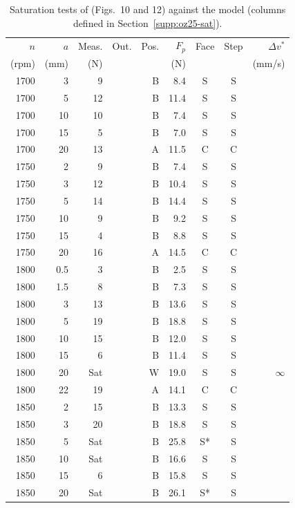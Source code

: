 \begin{table}[!htbp]
  \centering
  \caption{Saturation tests of \citet{ozsoy2025frequency} (Figs.~10 and 12) against the model (columns defined in Section~\ref{supp:oz25-sat}).}
  \label{tab:oz25}
  \scriptsize
  \setlength{\tabcolsep}{4pt}
  \renewcommand{\arraystretch}{0.84}
  \begin{tabular}{@{}rrrcrrccr@{}}
    \toprule
    $n$ & $a$ & Meas. & Out. & Pos. & $F_p$ & Face & Step & $\Delta v^*$\\
    (rpm) & (mm) & (N) & & & (N) & & & (mm/s)\\
    \midrule
1700 & 3 & 9 &  & B & 8.4 & S & S & \\
1700 & 5 & 12 &  & B & 11.4 & S & S & \\
1700 & 10 & 10 &  & B & 7.4 & S & S & \\
1700 & 15 & 5 &  & B & 7.0 & S & S & \\
1700 & 20 & 13 &  & A & 11.5 & C & C & \\
1750 & 2 & 9 &  & B & 7.4 & S & S & \\
1750 & 3 & 12 &  & B & 10.4 & S & S & \\
1750 & 5 & 14 &  & B & 14.4 & S & S & \\
1750 & 10 & 9 &  & B & 9.2 & S & S & \\
1750 & 15 & 4 &  & B & 8.8 & S & S & \\
1750 & 20 & 16 &  & A & 14.5 & C & C & \\
1800 & 0.5 & 3 &  & B & 2.5 & S & S & \\
1800 & 1.5 & 8 &  & B & 7.3 & S & S & \\
1800 & 3 & 13 &  & B & 13.6 & S & S & \\
1800 & 5 & 19 &  & B & 18.8 & S & S & \\
1800 & 10 & 15 &  & B & 12.0 & S & S & \\
1800 & 15 & 6 &  & B & 11.4 & S & S & \\
1800 & 20 & Sat &  & W & 19.0 & S & S & $\infty$\\
1800 & 22 & 19 &  & A & 14.1 & C & C & \\
1850 & 2 & 15 &  & B & 13.3 & S & S & \\
1850 & 3 & 20 &  & B & 18.8 & S & S & \\
1850 & 5 & Sat &  & B & 25.8 & S* & S & \\
1850 & 10 & Sat &  & B & 16.6 & S & S & \\
1850 & 15 & 6 &  & B & 15.8 & S & S & \\
1850 & 20 & Sat &  & B & 26.1 & S* & S & \\

\end{tabular}
\end{table}
